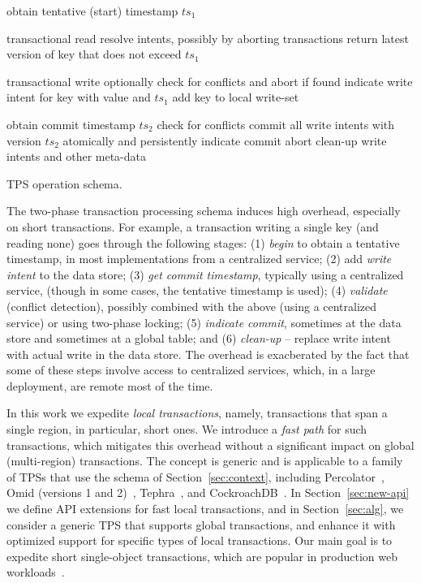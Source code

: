 \begin{algorithm}[tb]
\begin{algorithmic}
\State obtain tentative (start) timestamp $ts_1$ 
\EndProcedure
\Statex

 \Comment transactional read
	\State resolve intents, possibly by aborting transactions
\EndIf
\State return latest version of key that does not exceed $ts_1$
\EndProcedure
\Statex

 \Comment transactional write
\State optionally check for conflicts and abort if found 
\State indicate write intent for key with value and $ts_1$
\State add key to local write-set
\EndProcedure
\Statex

\State obtain commit timestamp $ts_2$
  \Comment check for conflicts
	\Statex \Comment commit all write intents with version $ts_2$
	\State atomically and persistently indicate commit 
\Else
	\State abort	
\EndIf
\State clean-up write intents and other meta-data
\EndProcedure
\end{algorithmic}
\caption{TPS operation schema.} 
\label{alg:schema}
\end{algorithm} 

The two-phase transaction processing schema induces high overhead, especially on short transactions. For example, a transaction writing a single key (and reading none) goes through the following stages:  
(1) \emph{begin} to obtain a tentative timestamp, in most implementations from a centralized service;  
(2) add \emph{write intent} to the data store; 
(3) \emph{get commit timestamp}, typically using a centralized service, (though in some cases, the tentative timestamp is used);
(4) \emph{validate} (conflict detection), possibly combined with the above (using a centralized service) or using two-phase locking; 
(5) \emph{indicate commit}, sometimes at the data store and sometimes at a global table; and 
(6) \emph{clean-up} -- replace write intent with actual write in the data store. 
The overhead is exacberated by 
the fact that some of these steps involve access to centralized services, which, in a large deployment, are remote most of the time.

In this work we expedite   \emph{local transactions}, namely,  transactions that span a single region, in particular, short ones. We
introduce a \emph{fast path} for such transactions, which mitigates this overhead
without a significant impact on global (multi-region) transactions.
The concept is generic and is applicable to a family of TPSs that use the schema of Section~\ref{sec:context}, 
including Percolator~\cite{Percolator2010}, Omid (versions 1 and 2)~\cite{OmidICDE2014,omid-blog}, Tephra~\cite{tephra}, 
and CockroachDB~\cite{cockroach}. 
In Section~\ref{sec:new-api} we define API extensions for fast local transactions, 
and in Section~\ref{sec:alg}, we consider  a generic TPS that supports global transactions, 
and enhance it with optimized support for specific types of local transactions. 
Our main goal is to expedite short single-object transactions,
which are popular in production web workloads~\cite{omid-blog}.

